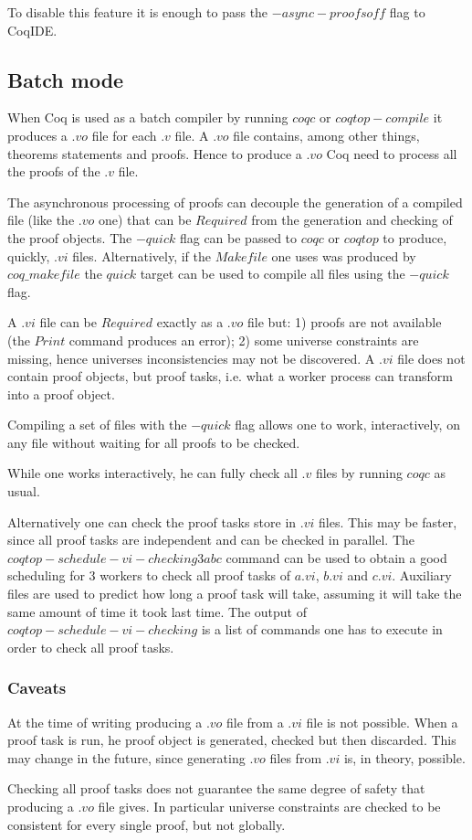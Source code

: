 To disable this feature it is enough to pass the $-async-proofs off$ flag to
CoqIDE.

\subsection{Batch mode}

When Coq is used as a batch compiler by running $coqc$ or $coqtop -compile$
it produces a $.vo$ file for each $.v$ file.  A $.vo$ file contains, among
other things, theorems statements and proofs.  Hence to produce a $.vo$
Coq need to process all the proofs of the $.v$ file.

The asynchronous processing of proofs can decouple the generation of a
compiled file (like the $.vo$ one) that can be $Required$ from the generation
and checking of the proof objects.  The $-quick$ flag can be passed to
$coqc$ or $coqtop$ to produce, quickly, $.vi$ files.  Alternatively, if
the $Makefile$ one uses was produced by $coq\_makefile$ the $quick$
target can be used to compile all files using the $-quick$ flag.

A $.vi$ file can be $Required$ exactly as a $.vo$ file but: 1) proofs are
not available (the $Print$ command produces an error); 2) some universe
constraints are missing, hence universes inconsistencies may not be
discovered.  A $.vi$ file does not contain proof objects, but proof tasks,
i.e. what a worker process can transform into a proof object.

Compiling a set of files with the $-quick$ flag allows one to work,
interactively, on any file without waiting for all proofs to be checked.

While one works interactively, he can fully check all $.v$ files by
running $coqc$ as usual.

Alternatively one can check the proof tasks store in $.vi$ files.  This may be
faster, since all proof tasks are independent and can be checked in parallel.
The $coqtop -schedule-vi-checking 3 a b c$ command can be used to obtain
a good scheduling for 3 workers to check all proof tasks of $a.vi$, $b.vi$ and
$c.vi$.  Auxiliary files are used to predict how long a proof task will take,
assuming it will take the same amount of time it took last time.
The output of $coqtop -schedule-vi-checking$ is a list of commands one has
to execute in order to check all proof tasks.

\subsubsection{Caveats}

At the time of writing producing a $.vo$ file from a $.vi$ file is not
possible.  When a proof task is run, he proof object is generated, checked but
then discarded.  This may change in the future, since generating $.vo$ files
from $.vi$ is, in theory, possible.  

Checking all proof tasks does not guarantee the same degree of safety
that producing a $.vo$ file gives.  In particular universe constraints
are checked to be consistent for every single proof, but not globally.

